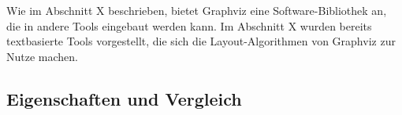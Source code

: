 Wie im Abschnitt X beschrieben, bietet Graphviz eine Software-Bibliothek an, die in andere Tools eingebaut werden kann. Im Abschnitt X wurden bereits textbasierte Tools vorgestellt, die sich die Layout-Algorithmen von Graphviz zur Nutze machen. 







\subsection{Eigenschaften und Vergleich}








